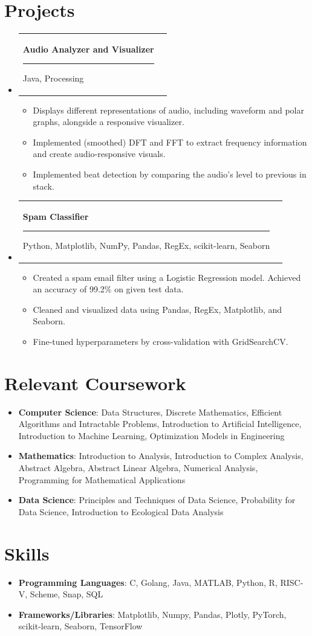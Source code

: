 \documentclass[letterpaper,11pt]{article}
\makeatletter
\newcommand{\resumeItem}[2]{
	\item\small{
		\textbf{#1}{: #2 \vspace{-2pt}}
	}
}
\newcommand{\resumeItemTwo}[1]{
	\item\small{
		#1 \vspace{-2pt}}
}
\newcommand{\resumeSubheadingTwo}[2]{
	\vspace{-1pt}\item
	\begin{tabular*}{0.97\textwidth}[t]{l@{\extracolsep{\fill}}r}
		\textbf{#1} \rule[-0.4ex]{0.1ex}{1.2em} #2 \\
	\end{tabular*}\vspace{-5pt}
}
\newcommand{\resumeSubItem}[2]{\resumeItem{#1}{#2}\vspace{-4pt}}
\newcommand{\resumeSubHeadingListStart}{\begin{itemize}[leftmargin=*]}
\newcommand{\resumeSubHeadingListEnd}{\end{itemize}}
\newcommand{\resumeItemListStart}{\begin{itemize}}
\newcommand{\resumeItemListEnd}{\end{itemize}\vspace{-5pt}}
\makeatother
\begin{document}
	\section{Projects}
	\resumeSubHeadingListStart
	
	\resumeSubheadingTwo
	{Audio Analyzer and Visualizer}{Java, Processing}
	\resumeItemListStart
	\resumeItemTwo{Displays different representations of audio, including waveform and polar graphs, alongside a responsive visualizer.}
	\resumeItemTwo{Implemented (smoothed) DFT and FFT to extract frequency information and create audio-responsive visuals.}
	\resumeItemTwo{Implemented beat detection by comparing the audio's level to previous in stack.}
	\resumeItemListEnd
	
	\resumeSubheadingTwo
	{Spam Classifier}{Python, Matplotlib, NumPy, Pandas, RegEx, scikit-learn, Seaborn}
	\resumeItemListStart
	\resumeItemTwo{Created a spam email filter using a Logistic Regression model. Achieved an accuracy of 99.2\% on given test data.}
	\resumeItemTwo{Cleaned and visualized data using Pandas, RegEx, Matplotlib, and Seaborn.}
	\resumeItemTwo{Fine-tuned hyperparameters by cross-validation with GridSearchCV.}
	\resumeItemListEnd
	
	\resumeSubHeadingListEnd
	
	\section{Relevant Coursework}
	\resumeSubHeadingListStart
	\resumeSubItem{Computer Science}
	{Data Structures, Discrete Mathematics, Efficient Algorithms and Intractable Problems, Introduction to Artificial Intelligence, Introduction to Machine Learning, Optimization Models in Engineering}
	\resumeSubItem{Mathematics}{Introduction to Analysis, Introduction to Complex Analysis, Abstract Algebra, Abstract Linear Algebra, Numerical Analysis, Programming for Mathematical Applications}
	\resumeSubItem{Data Science}{Principles and Techniques of Data Science, Probability for Data Science, Introduction to Ecological Data Analysis}
	\resumeSubHeadingListEnd
	
	\section{Skills}
	\resumeSubHeadingListStart
	\resumeSubItem{Programming Languages}
	{C, Golang, Java, MATLAB, Python, R, RISC-V, Scheme, Snap, SQL}
	\resumeSubItem{Frameworks/Libraries}{Matplotlib, Numpy, Pandas, Plotly, PyTorch, scikit-learn, Seaborn, TensorFlow}
	\resumeSubHeadingListEnd
\end{document}
